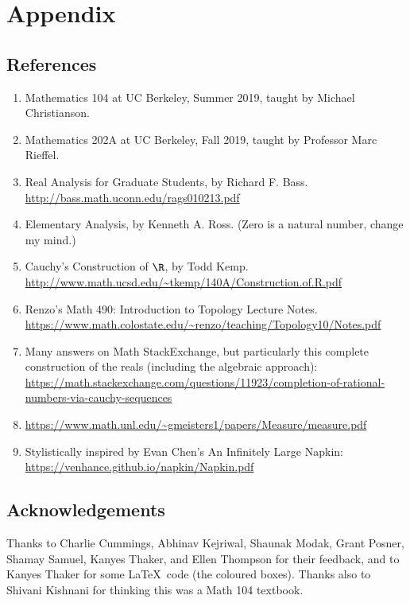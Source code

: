 \documentclass[../analysis.tex]{subfiles}
\begin{document}
    \section{Appendix}
    \subsection*{References}
    \begin{enumerate}
        \item Mathematics 104 at UC Berkeley, Summer 2019, taught by Michael Christianson.
        \item Mathematics 202A at UC Berkeley, Fall 2019, taught by Professor Marc Rieffel.
        \item Real Analysis for Graduate Students, by Richard F. Bass. \url{http://bass.math.uconn.edu/rags010213.pdf}
        \item Elementary Analysis, by Kenneth A. Ross. (Zero is a natural number, change my mind.)
        \item Cauchy's Construction of $\R$, by Todd Kemp. \url{http://www.math.ucsd.edu/~tkemp/140A/Construction.of.R.pdf}
        \item Renzo's Math 490: Introduction to Topology Lecture Notes. \url{https://www.math.colostate.edu/~renzo/teaching/Topology10/Notes.pdf}
        \item Many answers on Math StackExchange, but particularly this complete construction of the reals (including the algebraic approach): \url{https://math.stackexchange.com/questions/11923/completion-of-rational-numbers-via-cauchy-sequences}
        \item \url{https://www.math.unl.edu/~gmeisters1/papers/Measure/measure.pdf}
        \item Stylistically inspired by Evan Chen's An Infinitely Large Napkin: \url{https://venhance.github.io/napkin/Napkin.pdf}
    \end{enumerate}

    \subsection*{Acknowledgements}

    Thanks to Charlie Cummings, Abhinav Kejriwal, Shaunak Modak, Grant Posner, Shamay Samuel, Kanyes Thaker, and Ellen Thompson for their feedback, and to Kanyes Thaker for some \LaTeX \ code (the coloured boxes). Thanks also to Shivani Kishnani for thinking this was a Math 104 textbook.
\end{document}
